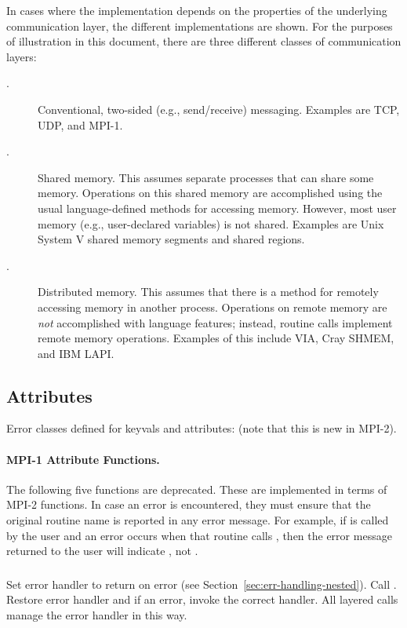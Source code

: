 \documentclass{article}
\begin{document}
In cases where the implementation depends on the properties of the
underlying communication layer, the different implementations are
shown.  For the purposes of illustration in this document, there are
three different classes of communication layers:
\begin{description}
\item[\tcpname.]Conventional, two-sided (e.g., send/receive)
messaging.  Examples are TCP, UDP, and MPI-1.  

\item[\shmemname.]Shared memory.  This assumes separate processes that
can share some memory.  Operations on this shared memory are
accomplished using the usual language-defined methods for accessing
memory.  However, most user memory (e.g., user-declared
variables) is not shared.  Examples are Unix System V shared memory
segments and shared  regions.  

\item[\vianame.]Distributed memory.  This assumes that there is a
method for remotely accessing memory in another process.  Operations
on remote memory are \emph{not} accomplished with language features;
instead, routine calls implement remote memory operations.  Examples
of this include VIA, Cray SHMEM, and IBM LAPI.
\end{description}

\subsection{Attributes}

Error classes defined for keyvals and attributes:
 (note that this is new in MPI-2).


\paragraph{MPI-1 Attribute Functions.}
The following five functions are deprecated.  These are implemented in
terms of MPI-2 functions.  In case an error is encountered, they must 
ensure that the original routine name is reported in any error
message.  For example, if  is called by the
user and an error occurs when that routine calls
, then the error message returned to the
user will indicate , not
.

\subsubsection{}
\begin{adi3}
Set error handler to return on error (see
Section~\ref{sec:err-handling-nested}).
Call .
Restore error handler and if an error, invoke the correct handler.
All layered calls manage the error handler in this way.
\end{adi3}
\end{document}
